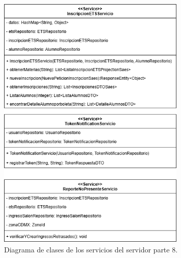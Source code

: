 \begin{figure}[htbp!]
	\begin{center}
		\includegraphics[width=0.8\textwidth]{Clases/Servicio8.png}
		\caption{Diagrama de clases de los servicios del servidor parte 8.}
		\label{fig:DS8}
	\end{center}
\end{figure}
